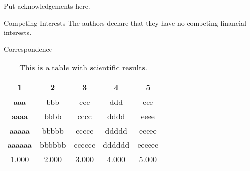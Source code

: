 \documentclass{nature}
\begin{document}





\begin{addendum}
 \item Put acknowledgements here.
 \item[Competing Interests] The authors declare that they have no
competing financial interests.
 \item[Correspondence] 
\end{addendum}


\begin{table}
\centering
\caption{This is a table with scientific results.}
\medskip
\begin{tabular}{ccccc}
\hline
1 & 2 & 3 & 4 & 5\\
\hline
aaa & bbb & ccc & ddd & eee\\
aaaa & bbbb & cccc & dddd & eeee\\
aaaaa & bbbbb & ccccc & ddddd & eeeee\\
aaaaaa & bbbbbb & cccccc & dddddd & eeeeee\\
1.000 & 2.000 & 3.000 & 4.000 & 5.000\\
\hline
\end{tabular}
\end{table}
\end{document}
